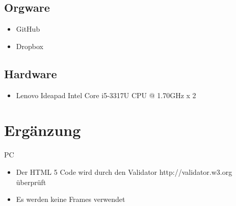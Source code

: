 \documentclass[a4paper]{scrreprt}
\begin{document}
    \section{Orgware}
        \begin{itemize}
        	\item GitHub
        	\item Dropbox
        \end{itemize}
        
    \section{Hardware}
        \begin{itemize}
        	\item Lenovo Ideapad Intel Core i5-3317U CPU @ 1.70GHz x 2
        \end{itemize}
        
        
        
\chapter{Ergänzung}
\begin{tiny}
PC
\end{tiny}

	\begin{itemize}
	\item Der HTML 5 Code wird durch den Validator
	http://validator.w3.org überprüft
	\item Es werden keine Frames verwendet
	\end{itemize}        
        
        
        
        
        
\printnoidxglossaries
\end{document}
